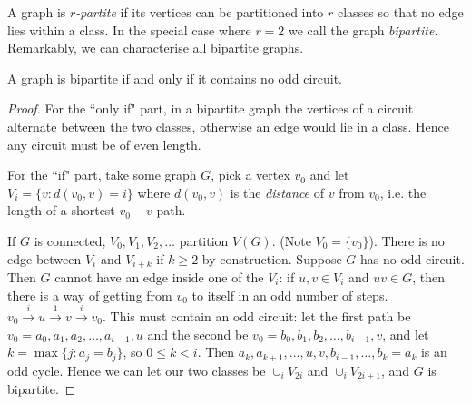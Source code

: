 \documentclass[10pt,a4paper]{article}
\begin{document}
A graph is \emph{$r$-partite} if its vertices can be partitioned into $r$ classes so that no edge lies within a class. In the special case where $r=2$ we call the graph \emph{bipartite}. Remarkably, we can characterise all bipartite graphs.
\begin{theorem}
A graph is bipartite if and only if it contains no odd circuit.
\end{theorem}
\begin{proof}
For the ``only if" part, in a bipartite graph the vertices of a circuit alternate between the two classes, otherwise an edge would lie in a class. Hence any circuit must be of even length.

For the ``if" part, take some graph $G$, pick a vertex $v_0$ and let $V_i = \{v : d(v_0,v) = i\}$ where $d(v_0,v)$ is the \emph{distance} of $v$ from $v_0$, i.e. the length of a shortest $v_0-v$ path. 
\begin{center}
\end{center}
If $G$ is connected, $V_0, V_1, V_2, \ldots$ partition $V(G)$. (Note $V_0 = \{v_0\}$). There is no edge between $V_i$ and $V_{i+k}$ if $k \geq 2$ by construction. Suppose $G$ has no odd circuit. Then $G$ cannot have an edge inside one of the $V_i$: if $u,v \in V_i$ and $uv\in G$, then there is a way of getting from $v_0$ to itself in an odd number of steps. $v_0 \xrightarrow{i} u \xrightarrow{1} v \xrightarrow{i} v_0$. This must contain an odd circuit: let the first path be $v_0=a_0,a_1,a_2,\ldots, a_{i-1}, u$ and the second be $v_0=b_0,b_1,b_2,\ldots,b_{i-1},v$, and let $k = \max\{j: a_j=b_j\}$, so $0\leq k <i$. Then $a_k, a_{k+1},\ldots,u,v,b_{i-1},\ldots,b_k=a_k$ is an odd cycle.  Hence we can let our two classes be $\cup_i V_{2i}$ and $\cup_i V_{2i+1}$, and $G$ is bipartite.
\end{proof}
\end{document}
